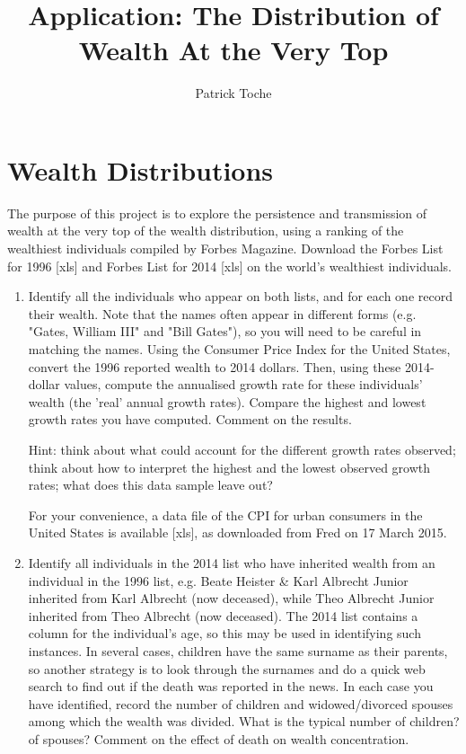 \documentclass[a4,12pt]{article}%
\title{Application: The Distribution of Wealth At the Very Top}
\author{Patrick Toche}
\date{}
\begin{document}
\maketitle

\newpage


\section*{Wealth Distributions}

The purpose of this project is to explore the persistence and transmission of wealth at the very top of the wealth distribution, using a ranking of the wealthiest individuals compiled by Forbes Magazine. Download the Forbes List for 1996 [xls] and Forbes List for 2014 [xls] on the world's wealthiest individuals.


\begin{enumerate}

\item 
Identify all the individuals who appear on both lists, and for each one record their wealth. Note that the names often appear in different forms (e.g. "Gates, William III" and "Bill Gates"), so you will need to be careful in matching the names. Using the Consumer Price Index for the United States, convert the 1996 reported wealth to 2014 dollars. Then, using these 2014-dollar values, compute the annualised growth rate for these individuals' wealth (the 'real' annual growth rates). Compare the highest and lowest growth rates you have computed. Comment on the results. 

Hint: think about what could account for the different growth rates observed; think about how to interpret the highest and the lowest observed growth rates; what does this data sample leave out?

For your convenience, a data file of the CPI for urban consumers in the United States is available [xls], as downloaded from Fred on 17 March 2015.

\item
Identify all individuals in the 2014 list who have inherited wealth from an individual in the 1996 list, e.g. Beate Heister \& Karl Albrecht Junior inherited from Karl Albrecht (now deceased), while Theo Albrecht Junior inherited from Theo Albrecht (now deceased). The 2014 list contains a column for the individual's age, so this may be used in identifying such instances. In several cases, children have the same surname as their parents, so another strategy is to look through the surnames and do a quick web search to find out if the death was reported in the news. In each case you have identified, record the number of children and widowed/divorced spouses among which the wealth was divided. What is the typical number of children? of spouses? Comment on the effect of death on wealth concentration. 


\end{enumerate}
\end{document}
